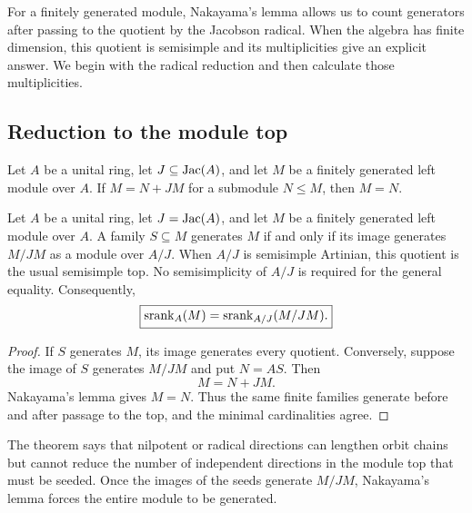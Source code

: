 \begin{readerroadmap}
For a finitely generated module, Nakayama's lemma allows us to count generators after passing to the quotient by the Jacobson radical.  When the algebra has finite dimension, this quotient is semisimple and its multiplicities give an explicit answer.  We begin with the radical reduction and then calculate those multiplicities.
\end{readerroadmap}
\subsection{Reduction to the module top}

\begin{classicalinput}
\label{ci:nakayama}
Let $A$ be a unital ring, let $J\subseteq\operatorname{Jac}(A)$, and let $M$ be a finitely generated left module over $A$.  If $M=N+JM$ for a submodule $N\leq M$, then $M=N$.
\end{classicalinput}

\begin{theorem}
\label{thm:module-top}
Let $A$ be a unital ring, let $J=\operatorname{Jac}(A)$, and let $M$ be a finitely generated left module over $A$.  A family $S\subseteq M$ generates $M$ if and only if its image generates $M/JM$ as a module over $A/J$.  When $A/J$ is semisimple Artinian, this quotient is the usual semisimple top.  No semisimplicity of $A/J$ is required for the general equality.  Consequently,
\[
\boxed{
\operatorname{srank}_A(M)=\operatorname{srank}_{A/J}(M/JM).
}
\]
\end{theorem}

\begin{proof}
If $S$ generates $M$, its image generates every quotient.  Conversely, suppose the image of $S$ generates $M/JM$ and put $N=AS$.  Then
\[
M=N+JM.
\]
Nakayama's lemma gives $M=N$.  Thus the same finite families generate before and after passage to the top, and the minimal cardinalities agree.
\end{proof}

\begin{interpretation}
The theorem says that nilpotent or radical directions can lengthen orbit chains but cannot reduce the number of independent directions in the module top that must be seeded.  Once the images of the seeds generate \(M/JM\), Nakayama's lemma forces the entire module to be generated.
\end{interpretation}

